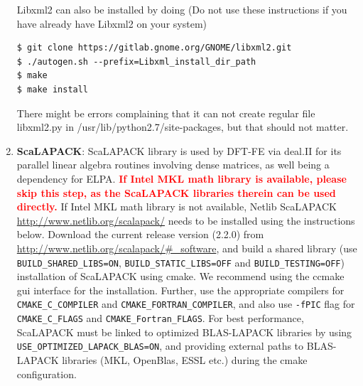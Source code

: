 \begin{enumerate}
Libxml2 can also be installed by doing (Do not use these instructions if you have already have Libxml2 on your system)
\begin{verbatim}
$ git clone https://gitlab.gnome.org/GNOME/libxml2.git
$ ./autogen.sh --prefix=Libxml_install_dir_path
$ make
$ make install 
\end{verbatim}
There might be errors complaining that it can not create regular file libxml2.py in /usr/lib/python2.7/site-packages, but that should not matter.

\item {\bf ScaLAPACK}: ScaLAPACK library is used by DFT-FE via deal.II for its parallel linear algebra routines involving dense matrices, as well being a dependency for ELPA. \textcolor{red}{\bf If Intel MKL math library is available, please skip this step, as the ScaLAPACK libraries therein can be used directly.} If Intel MKL math library is not available, Netlib ScaLAPACK \url{http://www.netlib.org/scalapack/} needs to be installed using the instructions below. Download the current release version (2.2.0) from \url{http://www.netlib.org/scalapack/#\_software}, and build a shared library (use \verb|BUILD_SHARED_LIBS=ON|, \verb|BUILD_STATIC_LIBS=OFF| and \verb|BUILD_TESTING=OFF|) installation of ScaLAPACK using cmake. We recommend using the ccmake gui interface for the installation.  Further, use the appropriate compilers for \verb|CMAKE_C_COMPILER| and \verb|CMAKE_FORTRAN_COMPILER|, and also use \verb|-fPIC| flag for \verb|CMAKE_C_FLAGS| and \verb|CMAKE_Fortran_FLAGS|. For best performance, ScaLAPACK must be linked to optimized BLAS-LAPACK libraries by using\\ \verb|USE_OPTIMIZED_LAPACK_BLAS=ON|, and providing external paths to BLAS-LAPACK libraries (MKL, OpenBlas, ESSL etc.) during the cmake configuration. 


\end{enumerate}
